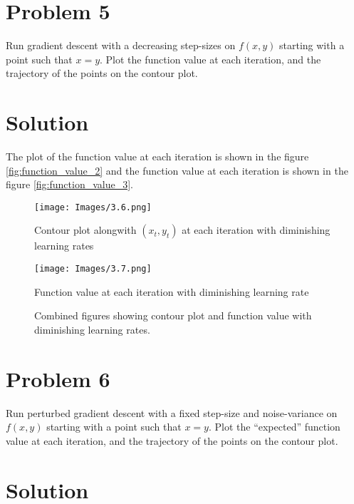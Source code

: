 \documentclass{article}
\begin{document}
\section*{Problem 5}

Run gradient descent with a decreasing step-sizes on $f(x, y)$ starting with a point such that $x = y$. Plot the function value at each iteration, and the trajectory of the points on the contour plot.

\section*{Solution}

The plot of the function value at each iteration is shown in the figure \ref{fig:function_value_2} and the function value at each iteration is shown in the figure \ref{fig:function_value_3}.

\begin{figure}[ht]
    \centering
    \begin{minipage}{0.5\textwidth}
        \centering
        \texttt{[image: Images/3.6.png]}
        \caption{Contour plot alongwith $(x_t, y_t)$ at each iteration with diminishing learning rates}
        \label{fig:function_value_2}
    \end{minipage}\hfill
    \begin{minipage}{0.5\textwidth}
        \centering
        \texttt{[image: Images/3.7.png]}
        \caption{Function value at each iteration with diminishing learning rate}
        \label{fig:function_value_3}
    \end{minipage}
    \caption{Combined figures showing contour plot and function value with diminishing learning rates.}
    \label{fig:combined_figures_2}
\end{figure}

\section*{Problem 6}

Run perturbed gradient descent with a fixed step-size and noise-variance on $f(x, y)$ starting with a point such that $x = y$. Plot the \enquote{expected} function value at each iteration, and the trajectory of the points on the contour plot.

\section*{Solution}
\end{document}
